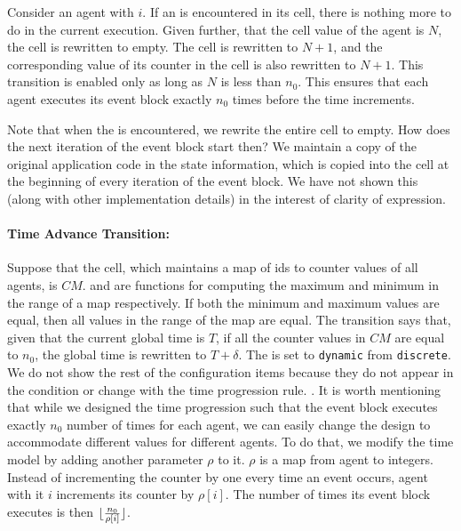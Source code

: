  Consider an agent with  $i$. If an  is encountered in its  cell, there is nothing more to do in the current execution. Given further, that the  cell value of the agent is $N$, the  cell is rewritten to empty. The  cell is rewritten to $N+1$, and the corresponding value of its counter in the  cell is also rewritten to $N+1$. This transition is enabled only as long as $N$ is less than $n_0$. This ensures that each agent executes its event block exactly $n_0$ times before the time increments. 
\vspace{-1mm}

Note that when the  is encountered, we rewrite the entire  cell to empty. How does the next iteration of the event block start then? We maintain a copy of the original application code in the state information, which is copied into the  cell at the beginning of every iteration of the event block. We have not shown this (along with other implementation details) in the interest of clarity of expression. 
\paragraph{Time Advance Transition:}
Suppose that the  cell, which maintains a map of ids to counter values of all agents, is $CM$.  and  are functions for computing the maximum and minimum in the range of a map respectively. If both the minimum and maximum values are equal, then all values in the range of the map are equal.  The  transition says that, given that the current global time is $T$, if all the counter values in $CM$ are equal to $n_0$, the global time is rewritten to $T+\delta$. The  is set to \verb|dynamic| from \verb|discrete|. We do not show the rest of the configuration items because they do not appear in the condition or change with the time progression rule. 
. 
It is worth mentioning that while we designed the time progression such that the event block executes exactly $n_0$ number of times for each agent, we can easily change the design to accommodate different values for different agents. To do that, we modify the time model by adding another parameter $\rho$ to it. $\rho$ is a map from agent  to integers. Instead of incrementing the counter by one every time an event occurs, agent with it $i$ increments its counter by $\rho[i]$. The number of times its event block executes is then $\lfloor\frac{n_0}{\rho[i]}\rfloor$.


